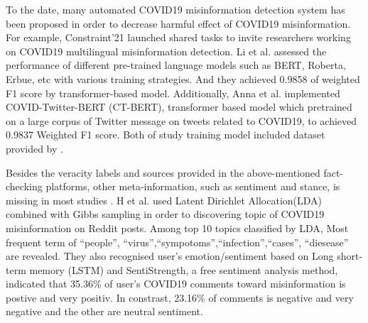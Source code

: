 To the date, many automated COVID19 misinformation detection system has been proposed in order to decrease harmful effect of COVID19 misinformation. 
For example, Constraint'21 \cite{patwa2021overview} launched shared tasks to invite researchers working on COVID19 multilingual misinformation detection.  
Li et al.\cite{li_exploring_2021} assessed the performance of different pre-trained language models such as BERT, Roberta, Erbue, etc with various training strategies. And they achieved 0.9858 of weighted F1 score by transformer-based model. 
Additionally, Anna et al. \cite{glazkova_g2tmn_2021} implemented COVID-Twitter-BERT (CT-BERT), transformer based model which pretrained on a large corpus of Twitter message on tweets related to COVID19, to achieved 0.9837 Weighted F1 score. Both of study training model included dataset provided by \cite{patwa2021overview}.


Besides the veracity labels and sources provided in the above-mentioned fact-checking platforms, other meta-information, such as sentiment and stance, is missing in most studies \cite{cheng_covid-19_2021}.
H et al. \cite{jelodar_deep_2020} used Latent Dirichlet Allocation(LDA) combined with Gibbs sampling  in order to discovering topic of COVID19 misinformation on Reddit posts. Among top 10 topics classified by LDA, Most frequent term of ``people'', ``virus'',``sympotoms'',``infection'',``cases'', ``diesease'' are revealed.  They also recognised user's emotion/sentiment based on Long short-term memory (LSTM) and SentiStrength, a free sentiment analysis method, indicated that 35.36\% of user's COVID19 comments toward misinformation is postive and very positiv. In constrast, 23.16\% of comments is negative and very negative and the other are neutral sentiment. 


